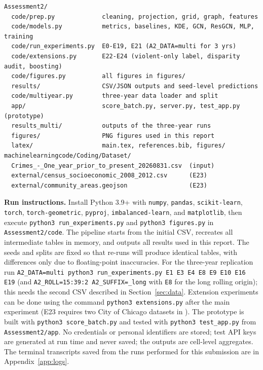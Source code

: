 \documentclass[11pt,a4paper]{report}
\begin{document}
\begin{small}
\begin{verbatim}
Assessment2/
  code/prep.py             cleaning, projection, grid, graph, features
  code/models.py           metrics, baselines, KDE, GCN, ResGCN, MLP, training
  code/run_experiments.py  E0-E19, E21 (A2_DATA=multi for 3 yrs)
  code/extensions.py       E22-E24 (violent-only label, disparity audit, boosting)
  code/figures.py          all figures in figures/
  results/                 CSV/JSON outputs and seed-level predictions
  code/multiyear.py        three-year data loader and split
  app/                     score_batch.py, server.py, test_app.py (prototype)
  results_multi/           outputs of the three-year runs
  figures/                 PNG figures used in this report
  latex/                   main.tex, references.bib, figures/
machinelearningcode/Coding/Dataset/
  Crimes_-_One_year_prior_to_present_20260831.csv  (input)
  external/census_socioeconomic_2008_2012.csv      (E23)
  external/community_areas.geojson                 (E23)
\end{verbatim}
\end{small}
\begingroup
\raggedright
\noindent\textbf{Run instructions.} Install Python 3.9+ with \texttt{numpy}, \texttt{pandas}, \texttt{scikit-learn}, \texttt{torch}, \texttt{torch-geometric}, \texttt{pyproj}, \texttt{imbalanced-learn}, and \texttt{matplotlib}, then execute \texttt{python3 run\_experiments.py} and \texttt{python3 figures.py} in \texttt{Assessment2/code}. The pipeline starts from the initial CSV, recreates all intermediate tables in memory, and outputs all results used in this report. The seeds and splits are fixed so that re-runs will produce identical tables, with differences only due to floating-point inaccuracies. For the three-year replication run \texttt{A2\_DATA=multi python3 run\_experiments.py E1 E3 E4 E8 E9 E10 E16 E19} (and \texttt{A2\_ROLL=15:39:2 A2\_SUFFIX=\_long} with \texttt{E8} for the long rolling origin); this needs the second CSV described in Section~\ref{sec:data}. Extension experiments can be done using the command \texttt{python3 extensions.py} after the main experiment (E23 requires two City of Chicago datasets in ). The prototype is built with \texttt{python3 score\_batch.py} and tested with \texttt{python3 test\_app.py} from \texttt{Assessment2/app}. No credentials or personal identifiers are stored; test API keys are generated at run time and never saved; the outputs are cell-level aggregates. The terminal transcripts saved from the runs performed for this submission are in Appendix~\ref{app:logs}.\par\endgroup
\end{document}
